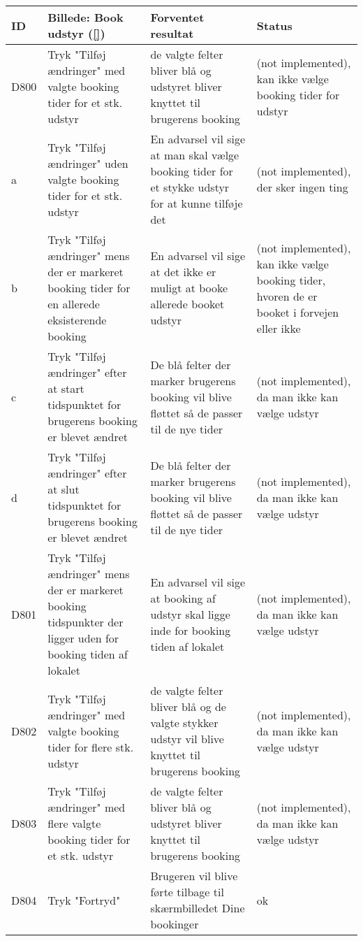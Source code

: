 \begin{tabular}{ |p{1cm}| p{5cm} | p{4cm} | p{1cm} | }
\hline
ID & Billede: Book udstyr (\ref{})  & Forventet resultat & Status\\ 
\hline
D800 & Tryk "Tilføj ændringer" med valgte booking tider for et stk. udstyr & de valgte felter bliver blå og udstyret bliver knyttet til brugerens booking &(not implemented), kan ikke vælge booking tider for udstyr \\
\hline
a & Tryk "Tilføj ændringer" uden valgte booking tider for et stk. udstyr & En advarsel vil sige at man skal vælge booking tider for et stykke udstyr for at kunne tilføje det &(not implemented), der sker ingen ting \\
\hline
b & Tryk "Tilføj ændringer" mens der er markeret booking tider for en allerede eksisterende booking & En advarsel vil sige at det ikke er muligt at booke allerede booket udstyr &(not implemented), kan ikke vælge booking tider, hvoren de er booket i forvejen eller ikke \\
\hline
c & Tryk "Tilføj ændringer" efter at start tidspunktet for brugerens booking er blevet ændret & De blå felter der marker brugerens booking vil blive fløttet så de passer til de nye tider &(not implemented), da man ikke kan vælge udstyr  \\
\hline
d & Tryk "Tilføj ændringer" efter at slut tidspunktet for brugerens booking er blevet ændret & De blå felter der marker brugerens booking vil blive fløttet så de passer til de nye tider & (not implemented), da man ikke kan vælge udstyr\\
\hline
D801 & Tryk "Tilføj ændringer" mens der er markeret booking tidspunkter der ligger uden for booking tiden af lokalet & En advarsel vil sige at booking af udstyr skal ligge inde for booking tiden af lokalet & (not implemented), da man ikke kan vælge udstyr \\
\hline
D802 & Tryk "Tilføj ændringer" med valgte booking tider for flere stk. udstyr & de valgte felter bliver blå og de valgte stykker udstyr vil blive knyttet til brugerens booking & (not implemented), da man ikke kan vælge udstyr \\
\hline
D803 & Tryk "Tilføj ændringer" med flere valgte booking tider for et stk. udstyr & de valgte felter bliver blå og udstyret bliver knyttet til brugerens booking & (not implemented), da man ikke kan vælge udstyr\\
\hline
D804 & Tryk "Fortryd" & Brugeren vil blive førte tilbage til skærmbilledet Dine bookinger & ok \\
\hline
\end{tabular}

